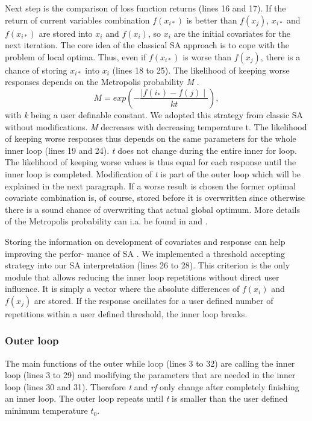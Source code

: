 Next step is the comparison of loss function returns (lines 16 and 17). If the return of current variables combination $f(x_{i*})$ is better than $f(x_j)$, $x_{i*}$ and $f(x_{i*})$ are stored into $x_{i}$ and $f(x_{i})$, so $x_{i}$ are the initial covariates for the next iteration. The core idea of the classical SA approach is to cope with the problem of local optima. Thus, even if $f(x_{i*})$ is worse than $f(x_{j})$, there is a chance of storing $x_{i*}$ into $x_i$ (lines 18 to 25). The likelihood of keeping worse responses depends on the Metropolis probability \textit{M} \citep{metropolis_1953}.
\begin{equation}
\label{eq:eq1}
M = exp \left(-\frac{\mid f(i_*)-f(j)\mid}{kt}\right),
\end{equation}
with \textit{k} being a user definable constant. We adopted this strategy from classic SA without modifications. \textit{M} decreases with decreasing temperature t. The likelihood of keeping worse responses thus depends on the same parameters for the whole inner loop (lines 19 and 24). \textit{t} does not change during the entire inner for loop. The likelihood of keeping worse values is thus equal for each response until the inner loop is completed. Modification of \textit{t} is part of the outer loop which will be explained in the next paragraph. If a worse result is chosen the former optimal covariate combination is, of course, stored before it is overwritten since otherwise there is a sound chance of overwriting that actual global optimum. More details of the Metropolis probability can i.a. be found in \citet{kirkpatrick_1983} and \citet{metropolis_1953}.

Storing the information on development of covariates and response can help improving the perfor- mance of SA \citep{lin_1995, hansen_2012}. We implemented a threshold accepting strategy \citep{dueck_1990} into our SA interpretation (lines 26 to 28). This criterion is the only module that allows reducing the inner loop repetitions without direct user influence. It is simply a vector where the absolute differences of $f(x_{i})$ and $f(x_j)$ are stored. If the response oscillates for a user defined number of repetitions within a user defined threshold, the inner loop breaks.

\subsubsection{Outer loop}
The main functions of the outer while loop (lines 3 to 32) are calling the inner loop (lines 3 to 29) and modifying the parameters that are needed in the inner loop (lines 30 and 31). Therefore \textit{t} and \textit{rf} only change after completely finishing an inner loop. The outer loop repeats until \textit{t} is smaller than the user defined minimum temperature $t_0$.

